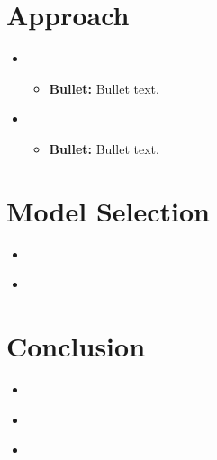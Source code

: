 \section{Approach}
\medskip
\begin{itemize}

    \item {}
    \begin{itemize}
    \item \textbf{Bullet:} Bullet text.
    \end{itemize}

    \item {}
    \begin{itemize}
    \item \textbf{Bullet:} Bullet text.


    \end{itemize}

\end{itemize}



\section{Model Selection}
\medskip
\begin{itemize}

    \item {} \\

    \item {} \\

\end{itemize}



\section{Conclusion}
\medskip
\begin{itemize}

    \item {} \\

    \item {} \\

    \item {} \\

\end{itemize}




